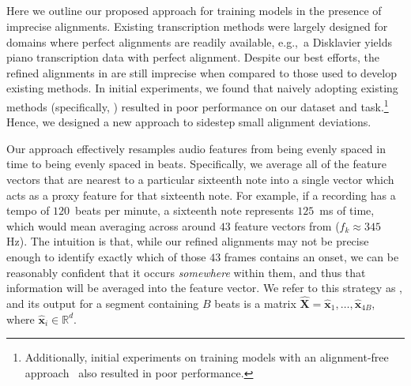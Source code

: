 \subsection{\Beatpooling}
\label{sec:beatpool}

Here we outline our proposed approach for training models in the presence of imprecise alignments. 
Existing transcription methods were largely designed for domains where perfect alignments are readily available, e.g.,~a Disklavier yields piano transcription data with perfect alignment. 
Despite our best efforts, the refined alignments in \hooktheory{} are still imprecise when compared to those used to develop existing methods. 
In initial experiments, we found that naively adopting existing methods (specifically, \cite{hawthorne2017onsets,hawthorne2021sequence}) resulted in poor performance on our dataset and task.\footnote{Additionally, initial experiments on training models with an alignment-free approach~\cite{graves2006connectionist} also resulted in poor performance.} 
Hence, we designed a new approach to sidestep small alignment deviations.

Our approach effectively resamples audio features  from being evenly spaced in time to being evenly spaced in beats. 
Specifically, we average all of the feature vectors that are nearest to a particular sixteenth note into a single vector which acts as a proxy feature for that sixteenth note. 
For example, if a recording has a tempo of $120$~beats per minute, a sixteenth note represents $125$~ms of time, which would mean averaging across around $43$ feature vectors from \jukebox{} (${f_k \approx 345}$ Hz). 
The intuition is that, while our refined alignments may not be precise enough to identify exactly which of those $43$ frames contains an onset, we can be reasonably confident that it occurs \emph{somewhere} within them, and thus that information will be averaged into the feature vector.
We refer to this strategy as \emph{\beatpooling}, and its output for a segment containing $B$ beats is a matrix ${\hat{\bm{X}} = \hat{\bm{x}}_1, \ldots, \hat{\bm{x}}_{4B}}$, where ${\hat{\bm{x}}_i \in \mathbb{R}^d}$. 


